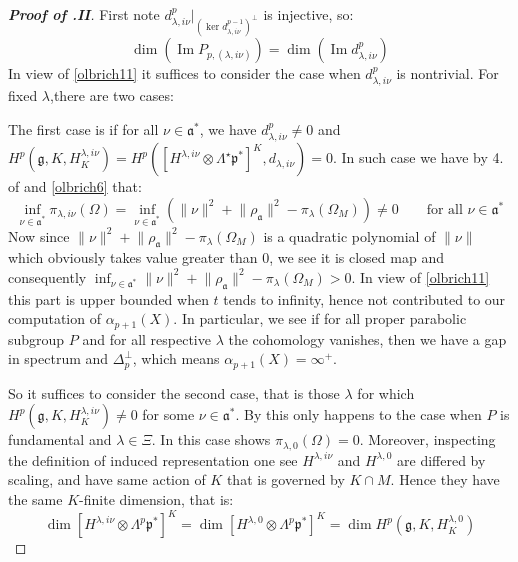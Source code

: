 \documentclass[11pt]{report}
\theoremstyle{definition}
\theoremstyle{plain}
\DeclareMathOperator{\im}{Im}
\newcommand{\norm}[1]{\lVert #1 \rVert}
\newcommand{\Lie}[1]{\mathfrak{#1}}
\begin{document}
\begin{proof}[\textbf{Proof of .II}] First note $d^p_{\lambda, i\nu}|_{(\ker d^{p-1}_{\lambda, i\nu})^\perp}$ is injective, so:
	\begin{equation}
	\dim(\im P_{p, (\lambda,i\nu)})=\dim (\im d^p_{\lambda, i\nu})
	\end{equation} 
In view of \ref{olbrich11} it suffices to consider the case when $d^p_{\lambda, i\nu}$ is nontrivial. For fixed $\lambda$,there are two cases: 
\par The first case is if for all $\nu\in \Lie{a}^*$, we have $d^p_{\lambda, i\nu}\neq 0$ and $H^p(\Lie{g}, K, H^{\lambda, i\nu}_K)=H^p([H^{\lambda, i\nu}\otimes \Lambda^\star\Lie{p}^*]^K, d_{\lambda, i\nu})= 0$. In such case we have by 4. of  and \ref{olbrich6} that:
\begin{equation}
\inf_{\nu\in \Lie{a}^*}\pi_{\lambda, i\nu}(\Omega)=\inf_{\nu\in \Lie{a}^*}(\norm{\nu}^2+\norm{\rho_{\Lie{a}}}^2-\pi_\lambda(\Omega_M))\neq 0 \qquad \text{for all $\nu\in \Lie{a}^*$}
\end{equation}
	Now since $\norm{\nu}^2+\norm{\rho_{\Lie{a}}}^2-\pi_\lambda(\Omega_M)$ is a quadratic polynomial of $\norm{\nu}$ which obviously takes value greater than $0$, we see it is closed map and consequently $\inf_{\nu\in \Lie{a}^*}\norm{\nu}^2+\norm{\rho_{\Lie{a}}}^2-\pi_\lambda(\Omega_M)>0$. In view of \ref{olbrich11} this part is upper bounded when $t$ tends to infinity, hence not contributed to our computation of $\alpha_{p+1}(X)$. In particular, we see if for all proper parabolic subgroup $P$ and for all respective $\lambda$ the cohomology vanishes, then we have a gap in spectrum and $\Delta^\perp_p$, which means $\alpha_{p+1}(X)=\infty^+$.
\par So it suffices to consider the second case, that is those $\lambda$ for which $H^p(\Lie{g}, K, H^{\lambda, i\nu}_K)\neq 0$ for some $\nu\in \Lie{a}^*$. By  this only happens to the case when $P$ is fundamental and $\lambda\in \Xi$. In this case  shows $\pi_{\lambda, 0}(\Omega)=0$. Moreover, inspecting the definition of induced representation one see $H^{\lambda, i\nu}$ and $H^{\lambda, 0}$ are differed by scaling, and have same action of $K$ that is governed by $K\cap M$. Hence they have the same $K$-finite dimension, that is:
\begin{equation}
\dim[H^{\lambda,i\nu}\otimes \Lambda^p\Lie{p}^*]^K=\dim[H^{\lambda,0}\otimes \Lambda^p\Lie{p}^*]^K=\dim H^p(\Lie{g}, K, H^{\lambda, 0}_K)
\end{equation}

\end{proof}
\end{document}

